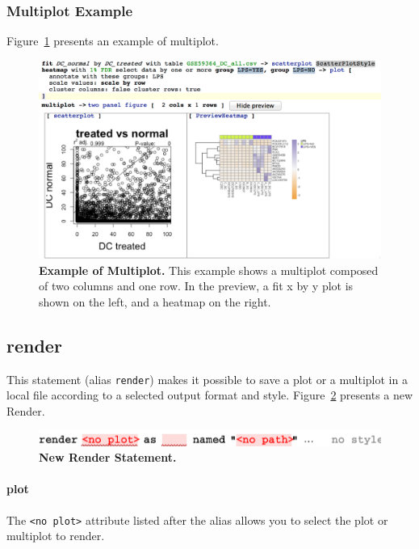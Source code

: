 \subsubsection{Multiplot Example}
Figure~\ref{fig:ExampleMultiplot} presents an example of multiplot.

\begin{figure}[h!tbp]
  \centering
  \includegraphics[width=\figWidthWide]{figures/MutliplotExample.png}
\caption[Example of Multiplot.]{\textbf{Example of Multiplot.} This example shows a multiplot composed of two columns and one row. In the preview,  a fit x by y plot is shown on the left, and a heatmap on the right. }
\label{fig:ExampleMultiplot}
\end{figure}

\subsection{render}
This statement (alias \texttt{render}) makes it possible to save a plot or a multiplot in a local file according to a selected output format and style. Figure~\ref{fig:NewRender} presents a new Render.


\begin{figure}[h!tbp]
  \centering
  \includegraphics[width=\figWidthNarrow]{figures/NewRender.pdf}
\caption[New Render Statement.]{\textbf{New Render Statement.}}
\label{fig:NewRender}
\end{figure}

\paragraph{plot}
The \texttt{<no plot>} attribute listed after the alias allows you to select the plot or multiplot to render.    

